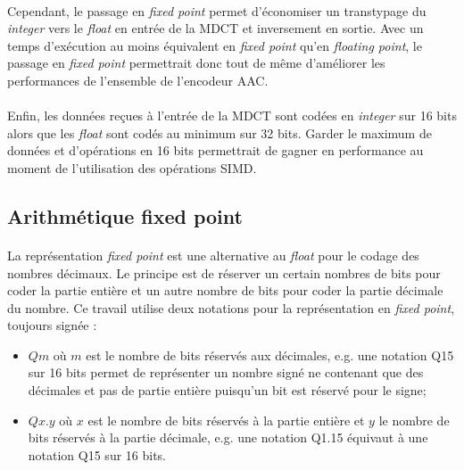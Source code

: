 \documentclass{article}
\begin{document}
    \paragraph{}
    Cependant, le passage en \emph{fixed point} permet d'économiser un transtypage du \emph{integer} vers le \emph{float} en entrée de la MDCT et inversement en sortie. Avec un temps d'exécution au moins équivalent en \emph{fixed point} qu'en \emph{floating point}, le passage en \emph{fixed point} permettrait donc tout de même d'améliorer les performances de l'ensemble de l'encodeur AAC.

    \paragraph{}
    Enfin, les données reçues à l'entrée de la MDCT sont codées en \emph{integer} sur 16 bits alors que les \emph{float} sont codés au minimum sur 32 bits. Garder le maximum de données et d'opérations en 16 bits permettrait de gagner en performance au moment de l'utilisation des opérations SIMD.

    \subsection{Arithmétique fixed point}

    \paragraph{}
    La représentation \emph{fixed point} est une alternative au \emph{float} pour le codage des nombres décimaux\cite{2007-Oberstar}. Le principe est de réserver un certain nombres de bits pour coder la partie entière et un autre nombre de bits pour coder la partie décimale du nombre. Ce travail utilise deux notations pour la représentation en \emph{fixed point}, toujours signée :
    \begin{itemize}
        \item $Qm$ où $m$ est le nombre de bits réservés aux décimales, e.g. une notation Q15 sur 16 bits permet de représenter un nombre signé ne contenant que des décimales et pas de partie entière puisqu'un bit est réservé pour le signe;
        \item $Qx.y$ où $x$ est le nombre de bits réservés à la partie entière et $y$ le nombre de bits réservés à la partie décimale, e.g. une notation Q1.15 équivaut à une notation Q15 sur 16 bits.
    \end{itemize}
\end{document}
